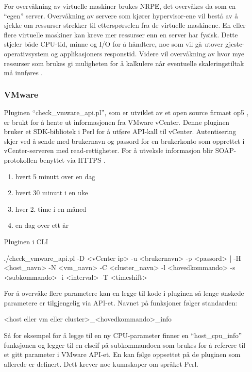 For overvåkning av virtuelle maskiner brukes NRPE, det overvåkes da som en “egen” server. Overvåkning av servere som kjører hypervisor-ene vil bestå av å sjekke om ressurser strekker til etterspørselen fra de virtuelle maskinene. En eller flere virtuelle maskiner kan kreve mer ressurser enn en server har fysisk. Dette stjeler både CPU-tid, minne og I/O for å håndtere, noe som vil gå utover gjeste-operativsystem og applikasjoners responstid. Videre vil overvåkning av hvor mye ressurser som brukes gi muligheten for å kalkulere når eventuelle skaleringstiltak må innføres \cite{vmwaremonitoring}. 

\subsubsection{VMware}

Pluginen “check\_vmware\_api.pl”, som er utviklet av et open source firmaet op5 \cite{op5}, er brukt for å hente ut informasjonen fra VMware vCenter. Denne pluginen bruker et SDK-bibliotek i Perl \cite{vmwareperl} for å utføre API-kall til vCenter. Autentisering skjer ved å sende med brukernavn og passord for en brukerkonto som opprettet i vCenter-serveren med read-rettigheter. For å utveksle informasjon blir SOAP-protokollen benyttet \cite{wiki:soap} via HTTPS \cite{ciscovirtual}. 
\begin{enumerate}
	\item hvert 5 minutt over en dag 
	\item hvert 30 minutt i en uke
	\item hver 2. time i en måned
	\item en dag over ett år
\end{enumerate}

Pluginen i CLI

./check\_vmware\_api.pl -D <vCenter ip> -u <brukernavn> -p <passord> | -H <host\_navn> -N <vm\_navn> -C <cluster\_navn>  -l <hovedkommando> -s <subkommando> -i <interval> -T <timeshift>

For å overvåke flere parametere kan en legge til kode i pluginen så lenge ønskede parametere er tilgjengelig via API-et. Navnet på funksjoner følger standarden:

<host eller vm eller cluster>\_<hovedkommando>\_info 

Så for eksempel for å legge til en ny CPU-parameter finner en “host\_cpu\_info” funksjonen og legger til en elseif på subkommandoen som brukes for å referere til et gitt parameter i VMware API-et. En kan følge oppsettet på de pluginen som allerede er definert. Dett krever noe kunnskaper om språket Perl.

